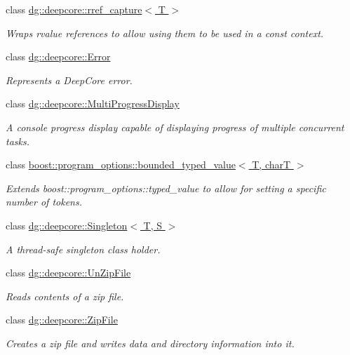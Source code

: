 \begin{DoxyCompactItemize}
class \hyperlink{classdg_1_1deepcore_1_1rref__capture}{dg\+::deepcore\+::rref\+\_\+capture$<$ T $>$}
\begin{DoxyCompactList}\small\item\em Wraps rvalue references to allow using them to be used in a {\ttfamily const} context. \end{DoxyCompactList}\item 
class \hyperlink{classdg_1_1deepcore_1_1_error}{dg\+::deepcore\+::\+Error}
\begin{DoxyCompactList}\small\item\em Represents a Deep\+Core error. \end{DoxyCompactList}\item 
class \hyperlink{classdg_1_1deepcore_1_1_multi_progress_display}{dg\+::deepcore\+::\+Multi\+Progress\+Display}
\begin{DoxyCompactList}\small\item\em A console progress display capable of displaying progress of multiple concurrent tasks. \end{DoxyCompactList}\item 
class \hyperlink{classboost_1_1program__options_1_1bounded__typed__value}{boost\+::program\+\_\+options\+::bounded\+\_\+typed\+\_\+value$<$ T, char\+T $>$}
\begin{DoxyCompactList}\small\item\em Extends boost\+::program\+\_\+options\+::typed\+\_\+value to allow for setting a specific number of tokens. \end{DoxyCompactList}\item 
class \hyperlink{classdg_1_1deepcore_1_1_singleton}{dg\+::deepcore\+::\+Singleton$<$ T, S $>$}
\begin{DoxyCompactList}\small\item\em A thread-\/safe singleton class holder. \end{DoxyCompactList}\item 
class \hyperlink{classdg_1_1deepcore_1_1_un_zip_file}{dg\+::deepcore\+::\+Un\+Zip\+File}
\begin{DoxyCompactList}\small\item\em Reads contents of a zip file. \end{DoxyCompactList}\item 
class \hyperlink{classdg_1_1deepcore_1_1_zip_file}{dg\+::deepcore\+::\+Zip\+File}
\begin{DoxyCompactList}\small\item\em Creates a zip file and writes data and directory information into it. \end{DoxyCompactList}\end{DoxyCompactItemize}
